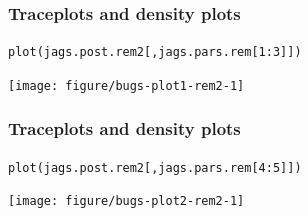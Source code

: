 \documentclass[color=usenames,dvipsnames]{beamer}\usepackage[]{graphicx}\usepackage[]{xcolor}
\makeatletter
\newcommand{\hlnum}[1]{\textcolor[rgb]{0.69,0.494,0}{#1}}%
\newcommand{\hlopt}[1]{\textcolor[rgb]{0,0,0}{#1}}%
\newcommand{\hlstd}[1]{\textcolor[rgb]{0,0,0}{#1}}%
\newcommand{\hlkwd}[1]{\textcolor[rgb]{0.004,0.004,0.506}{#1}}%
\newenvironment{kframe}{%
 \def\at@end@of@kframe{}%
 \ifinner\ifhmode%
  \def\at@end@of@kframe{\end{minipage}}%
  \begin{minipage}{\columnwidth}%
 \fi\fi%
 \def\FrameCommand##1{\hskip\@totalleftmargin \hskip-\fboxsep
 \colorbox{shadecolor}{##1}\hskip-\fboxsep
     \hskip-\linewidth \hskip-\@totalleftmargin \hskip\columnwidth}%
 \MakeFramed {\advance\hsize-\width
   \@totalleftmargin\z@ \linewidth\hsize
   \@setminipage}}%
 {\par\unskip\endMakeFramed%
 \at@end@of@kframe}
\newenvironment{knitrout}{}{} %
\makeatother
\begin{document}
\begin{frame}[fragile]
  \frametitle{Traceplots and density plots}
\begin{knitrout}\footnotesize
{}\color{fgcolor}\begin{kframe}
\begin{alltt}
\hlkwd{plot}\hlstd{(jags.post.rem2[,jags.pars.rem[}\hlnum{1}\hlopt{:}\hlnum{3}\hlstd{]])}
\end{alltt}
\end{kframe}

{\centering \texttt{[image: figure/bugs-plot1-rem2-1]} 

}


\end{knitrout}
\end{frame}



\begin{frame}[fragile]
  \frametitle{Traceplots and density plots}
\begin{knitrout}\footnotesize
{}\color{fgcolor}\begin{kframe}
\begin{alltt}
\hlkwd{plot}\hlstd{(jags.post.rem2[,jags.pars.rem[}\hlnum{4}\hlopt{:}\hlnum{5}\hlstd{]])}
\end{alltt}
\end{kframe}

{\centering \texttt{[image: figure/bugs-plot2-rem2-1]} 

}


\end{knitrout}
\end{frame}





\end{document}

